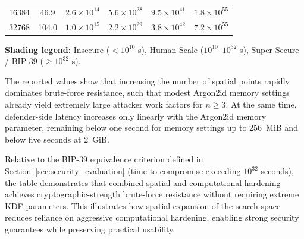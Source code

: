 \documentclass[journal,article,submit,pdftex,moreauthors]{Definitions/mdpi}
\begin{document}
\begin{table}[H]
\begin{tabular}{rccccc}
\midrule
16384 & 46.9 &
\cellcolor{humanscale}$2.6\times10^{14}$ &
\cellcolor{humanscale}$5.6\times10^{28}$ &
\cellcolor{supersecure}$9.5\times10^{41}$ &
\cellcolor{supersecure}$1.8\times10^{55}$ \\

32768 & 104.0 &
\cellcolor{humanscale}$1.0\times10^{15}$ &
\cellcolor{humanscale}$2.2\times10^{29}$ &
\cellcolor{supersecure}$3.8\times10^{42}$ &
\cellcolor{supersecure}$7.2\times10^{55}$ \\
\bottomrule
\end{tabular}

\vspace{0.5em}
\footnotesize
\textbf{Shading legend:}
 Insecure ($<10^{10}$ s),
 Human-Scale ($10^{10}$–$10^{32}$ s),
 Super-Secure / BIP-39 ($\ge 10^{32}$ s).
\end{table}


The reported values show that increasing the number of spatial points rapidly dominates brute-force resistance, such that modest Argon2id memory settings already yield extremely large attacker work factors for $n \ge 3$. At the same time, defender-side latency increases only linearly with the Argon2id memory parameter, remaining below one second for memory settings up to 256~MiB and below five seconds at 2~GiB.

Relative to the BIP-39 equivalence criterion defined in Section~\ref{sec:security_evaluation} (time-to-compromise exceeding $10^{32}$ seconds), the table demonstrates that combined spatial and computational hardening achieves cryptographic-strength brute-force resistance without requiring extreme KDF parameters. This illustrates how spatial expansion of the search space reduces reliance on aggressive computational hardening, enabling strong security guarantees while preserving practical usability.
\end{document}

